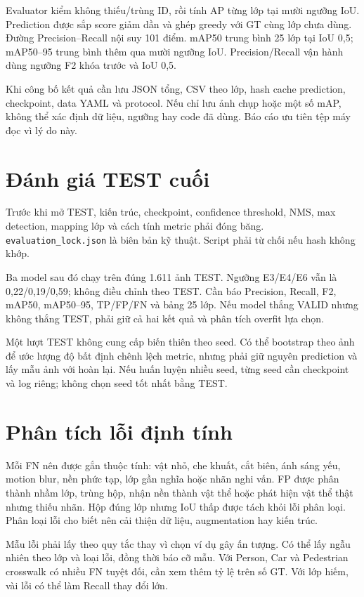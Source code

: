 \documentclass[12pt,a4paper,oneside]{report}
\begin{document}
Evaluator kiểm không thiếu/trùng ID, rồi tính AP từng lớp tại mười ngưỡng IoU. Prediction được sắp score giảm dần và ghép greedy với GT cùng lớp chưa dùng. Đường Precision--Recall nội suy 101 điểm. mAP50 trung bình 25 lớp tại IoU 0,5; mAP50--95 trung bình thêm qua mười ngưỡng IoU. Precision/Recall vận hành dùng ngưỡng F2 khóa trước và IoU 0,5.

Khi công bố kết quả cần lưu JSON tổng, CSV theo lớp, hash cache prediction, checkpoint, data YAML và protocol. Nếu chỉ lưu ảnh chụp hoặc một số mAP, không thể xác định dữ liệu, ngưỡng hay code đã dùng. Báo cáo ưu tiên tệp máy đọc vì lý do này.

\section{Đánh giá TEST cuối}
Trước khi mở TEST, kiến trúc, checkpoint, confidence threshold, NMS, max detection, mapping lớp và cách tính metric phải đóng băng. \texttt{evaluation\_lock.json} là biên bản kỹ thuật. Script phải từ chối nếu hash không khớp.

Ba model sau đó chạy trên đúng 1.611 ảnh TEST. Ngưỡng E3/E4/E6 vẫn là 0,22/0,19/0,59; không điều chỉnh theo TEST. Cần báo Precision, Recall, F2, mAP50, mAP50--95, TP/FP/FN và bảng 25 lớp. Nếu model thắng VALID nhưng không thắng TEST, phải giữ cả hai kết quả và phân tích overfit lựa chọn.

Một lượt TEST không cung cấp biến thiên theo seed. Có thể bootstrap theo ảnh để ước lượng độ bất định chênh lệch metric, nhưng phải giữ nguyên prediction và lấy mẫu ảnh với hoàn lại. Nếu huấn luyện nhiều seed, từng seed cần checkpoint và log riêng; không chọn seed tốt nhất bằng TEST.

\section{Phân tích lỗi định tính}
Mỗi FN nên được gắn thuộc tính: vật nhỏ, che khuất, cắt biên, ánh sáng yếu, motion blur, nền phức tạp, lớp gần nghĩa hoặc nhãn nghi vấn. FP được phân thành nhầm lớp, trùng hộp, nhận nền thành vật thể hoặc phát hiện vật thể thật nhưng thiếu nhãn. Hộp đúng lớp nhưng IoU thấp được tách khỏi lỗi phân loại. Phân loại lỗi cho biết nên cải thiện dữ liệu, augmentation hay kiến trúc.

Mẫu lỗi phải lấy theo quy tắc thay vì chọn ví dụ gây ấn tượng. Có thể lấy ngẫu nhiên theo lớp và loại lỗi, đồng thời báo cỡ mẫu. Với Person, Car và Pedestrian crosswalk có nhiều FN tuyệt đối, cần xem thêm tỷ lệ trên số GT. Với lớp hiếm, vài lỗi có thể làm Recall thay đổi lớn.
\end{document}
